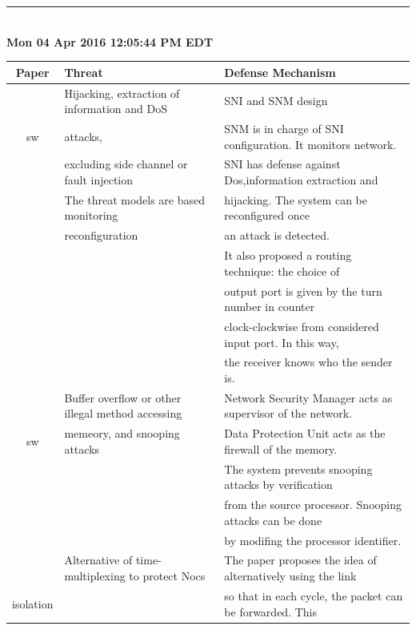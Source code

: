 \documentclass[]{article}
\begin{document}
\rule[-0.1cm]{7.5in}{0.01cm}\\
\noindent \textbf{Mon 04 Apr 2016 12:05:44 PM EDT}
\begin{table}[!t]
	\centering
	\begin{tabular}{c l l}
		Paper & Threat & Defense Mechanism\\
	\hline
	~\cite{diguet2007noc} 	& Hijacking, extraction of information and DoS  	& SNI and SNM design\\
	sw					  	& attacks,											& SNM is in charge of SNI configuration. It monitors network.\\
						  	& excluding side channel or fault injection 		& SNI has defense against Dos,information extraction and\\
						  	& The threat models are based monitoring  			& hijacking. The system can be reconfigured once\\
						  	& reconfiguration									& an attack is detected.\\
							&													& It also proposed a routing technique: the choice of\\
							&													& output port is given by the turn number in counter\\
							& 													& clock-clockwise from considered input port. In this way,\\
							& 													& the receiver knows who the sender is.\\
	\hline
	\cite{fiorin2008secure} & Buffer overflow or other illegal method accessing & Network Security Manager acts as supervisor of the network.\\
	sw						& memeory, and snooping attacks 					& Data Protection Unit acts as the firewall of the memory.\\
							& 													& The system prevents snooping attacks by verification\\
							& 													& from the source processor. Snooping attacks can be done\\
							& 													& by modifing the processor identifier.\\
	\hline
	\cite{wassel2013surfnoc}& Alternative of time-multiplexing to protect Nocs  & The paper proposes the idea of alternatively using the link\\
	isolation				&													& so that in each cycle, the packet can be forwarded. This \\

\end{tabular}
\end{table}
\end{document}
